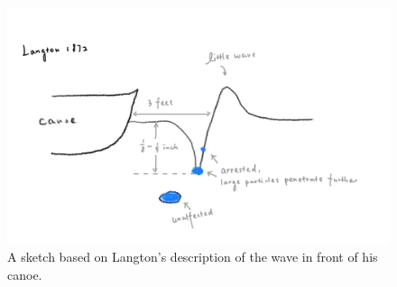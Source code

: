\documentclass[12pt]{article}
\begin{document}
\begin{figure}
    \centering
    \includegraphics[width=\textwidth]{Figures/Langton 1872.png}
    \caption{A sketch based on Langton's description of the wave in front of his canoe.}
    \label{fig:Longton-1872}
\end{figure}
\end{document}
